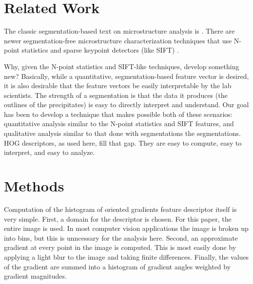 \documentclass[review]{elsarticle}
\begin{document}
	\section{Related Work}\label{relatedwork}
		The classic segmentation-based text on microstructure analysis is \cite{underwood}. There are newer segmentation-free microstructure characterization techniques that use N-point statistics \cite{kalidindi1, kalidindi2} and sparse keypoint detectors (like SIFT) \cite{decost}.

		Why, given the N-point statistics and SIFT-like techniques, develop something new? Basically, while a quantitative, segmentation-based feature vector is desired, it is also desirable that the feature vectors be easily interpretable by the lab scientists. The strength of a segmentation is that the data it produces (the outlines of the precipitates) is easy to directly interpret and understand. Our goal has been to develop a technique that makes possible both of these scenarios: quantitative analysis similar to the N-point statistics and SIFT features, and qualitative analysis similar to that done with segmentations the segmentations. HOG descriptors, as used here, fill that gap. They are easy to compute, easy to interpret, and easy to analyze.
	
	
	
	

	\section{Methods}\label{methodsandmaterials}
		Computation of the histogram of oriented gradients feature descriptor itself is very simple. First, a domain for the descriptor is chosen. For this paper, the entire image is used. In most computer vision applications the image is broken up into bins, but this is unncessary for the analysis here. Second, an approximate gradient at every point in the image is computed. This is most easily done by applying a light blur to the image and taking finite differences. Finally, the values of the gradient are summed into a histogram of gradient angles weighted by gradient magnitudes.
\end{document}
